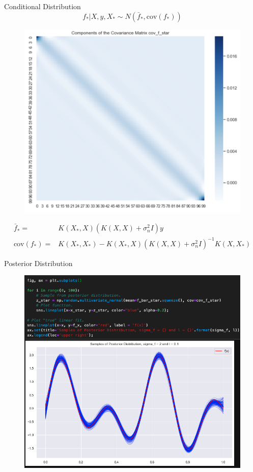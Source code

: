 \documentclass[10pt]{beamer}
\begin{document}
\begin{frame}{Conditional Distribution}
 $$f_* | X, y, X_*\sim N(\bar{f}_*, \text{cov}(f_*))$$
\begin{center}
\begin{figure}
\includegraphics[scale=0.27]{images/cov_posterior_example2.png} 
\end{figure}
\end{center}
 \begin{align*}
\bar{f}_* =& K(X_*,X)(K(X,X) + \sigma_n^2 I)y \\
\text{cov}(f_*) =& K(X_*,X_*) - K(X_*,X)(K(X,X) + \sigma_n^2I)^{-1}K(X,X_*)
\end{align*}
\end{frame}


\begin{frame}{Posterior Distribution}
\begin{center}
\begin{figure}
\includegraphics[scale=0.35]{images/code_sample_posterior_example2.png} 
\end{figure}
\end{center}
\end{frame}
\end{document}
